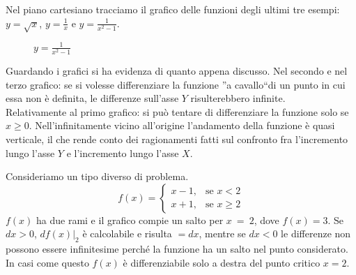 Nel piano cartesiano tracciamo il grafico delle funzioni degli ultimi 
tre esempi: $y=\sqrt{x}$, $y=\frac{1}{x}$ e $y=\frac{1}{x^2-1}$.
\begin{figure}[h]
\begin{inaccessibleblock}
 \begin{center}
 \begin{minipage}[]{.23 \textwidth}
  \vspace*{4mm} 
  \radice
  \vspace*{-5mm} 
  \caption{$y=\sqrt{x}$}
 \end{minipage} 
 \begin{minipage}[]{.37 \textwidth}
  \iperbole
  \caption{$y=\frac{1}{x}$}
 \end{minipage} 
 \begin{minipage}[]{.37 \textwidth}
  \iperbolequad
  \caption{$y=\frac{1}{x^2-1}$}
 \end{minipage}
 \end{center}
\end{inaccessibleblock}
\label{fig:diff01_grafici}
\end{figure}

Guardando i grafici si ha evidenza di quanto appena discusso.
Nel secondo e nel terzo grafico: se si volesse 
differenziare la funzione ''a cavallo``di un punto in cui essa non è 
definita, le differenze sull'asse \(Y\) risulterebbero infinite.\\
Relativamente al primo grafico: si può tentare di differenziare la funzione 
solo se \(x \ge 0\). Nell'infinitamente vicino all'origine l'andamento della 
funzione è quasi verticale, il che rende conto dei ragionamenti fatti sul 
confronto fra l'incremento lungo l'asse \(Y\) e l'incremento lungo l'asse \(X\).

\begin{inaccessibleblock}
 \begin{center}
 \begin{minipage}[]{.38 \textwidth}
  \salto
 \end{minipage} 
 \hfill
 \begin{minipage}[]{.58 \textwidth}
Consideriamo un tipo diverso di problema.\\
\[f(x)=\begin{cases} 
x-1, & \mbox{se }x<2 \\ 
x+1, & \mbox{se }x\ge 2
\end{cases}
\]
$f(x)$ ha due rami e il grafico compie un salto per $x~=~2$, dove \(f(x)=3\).
Se \(dx>0\), \(df(x)|_2\) è calcolabile e risulta \(=dx\), mentre se \(dx<0\)
le differenze non possono essere infinitesime perché la funzione ha un salto 
nel 
punto considerato. In casi come questo $f(x)$ è differenziabile solo a destra 
del punto critico $x=2$.
 \end{minipage}
 \end{center}
\end{inaccessibleblock}
\label{fig:diff01_salto}



